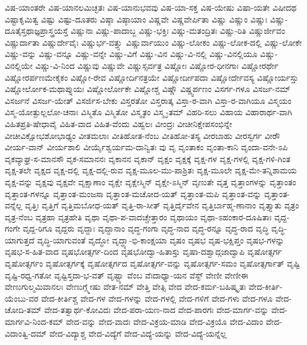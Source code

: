 {ವಿಷ-ಯಾಂತರೇ
ವಿಷ-ಯಾನಲಮಿಚ್ಛತಃ
ವಿಷ-ಯಾನುಭವವು
ವಿಷ-ಯಾ-ಸಕ್ತ
ವಿಷ-ಯೇಷು
ವಿಷಾ-ಯತೇ
ವಿಷೀದಥ
ವಿಷ್ಟಾಕೃಮಿತ್ವ
ವಿಷ್ಟು
ವಿಷ್ಟು-ದೂತರು
ವಿಷ್ಠಾ
ವಿಷ್ಠಾಯಾಂ
ವಿಷ್ಣವೇ
ವಿಷ್ಣವೇರ್ಪಿತಾ
ವಿಷ್ಣು
ವಿಷ್ಣುಂ
ವಿಷ್ಣುಃ
ವಿಷ್ಣು-ದೂತೈಸ್ತಥಾಜ್ಞಪ್ರಾಸ್ತ್ರಯಸ್ತೆ
ವಿಷ್ಣುನಾ
ವಿಷ್ಣು-ಪಾದಾಬ್ಜ
ವಿಷ್ಣು-ಭಕ್ತಿಃ
ವಿಷ್ಣು-ಮತಂದ್ರಿತಃ
ವಿಷ್ಣು-ರಿತಿ
ವಿಷ್ಣುರ್ಜೀವಂ
ವಿಷ್ಣುರ್ದಾತಾ
ವಿಷ್ಣುರ್ದೇವೈಃ
ವಿಷ್ಣುರ್ಭ-ವತ್ತ್ಸು
ವಿಷ್ಣುರ್ವಾಯುಂ
ವಿಷ್ಣು-ಲೋಕಂ
ವಿಷ್ಣು-ಲೋಕ-ದಲ್ಲಿ
ವಿಷ್ಣು-ಲೋಕೇ
ವಿಷ್ಣು-ವನ್ನು
ವಿಷ್ಣು-ವನ್ನೂ
ವಿಷ್ಣು-ವನ್ನೇ
ವಿಷ್ಣು-ವಿಗೆ
ವಿಷ್ಣು-ವಿನ
ವಿಷ್ಣು-ವಿ-ನಲ್ಲಿ
ವಿಷ್ಣು-ವಿನಲ್ಲಿಯೂ
ವಿಷ್ಣು-ವಿನಲ್ಲಿಯೇ
ವಿಷ್ಣು-ವಿ-ನಿಂದ
ವಿಷ್ಣುವು
ವಿಷ್ಣುವೇ
ವಿಷ್ಣುಸ್ಸರ್ವತ್ರ
ವಿಷ್ಣೋಃ
ವಿಷ್ಣೋರ-ಧೀನಗಾಃ
ವಿಷ್ಣೋರರ್ಥೇ
ವಿಷ್ಣೋರರ್ಪಣಮೇಕೈಕಂ
ವಿಷ್ಣೋ-ರೇವ
ವಿಷ್ಣೋರ್ದಿನತ್ರಯೇ
ವಿಷ್ಣೋರ್ದೀಪದಾ
ವಿಷ್ಣೋರ್ದೇವಸ್ಯ
ವಿಷ್ಣೋರ್ಯಸ್ತು
ವಿಷ್ಣೋರ್ಲೋಕ-ಮಥಾಪ್ನುಯಃ
ವಿಷ್ಣೋರ್ಲೋಕೇ
ವಿಷ್ಣೋಶ್ಚ
ವಿಷ್ಣೌ
ವಿಷ್ಣ್ವರ್ಪಣಂ
ವಿಸರ್ಗ-ಗಳೂ
ವಿಸರ್ಜ-ನಮ್
ವಿಸರ್ಜನೆ
ವಿಸರ್ಜ-ಯೇತ್
ವಿಸರ್ಜಿಸ-ಬೇಕು
ವಿಸ್ತರತೋ
ವಿಸ್ತರಾತ್ಕ
ವಿಸ್ತಾ-ರ-ವಾಗಿ
ವಿಸ್ತಾ-ರ-ವಾಗಿಯೂ
ವಿಸ್ಮಯಂ
ವಿಸ್ಮ-ಯೋತ್ಫುಲ್ಲಲೋ-ಚನಾಃ
ವಿಸ್ಮಿತೊ
ವಿಸ್ಮಿತೋ
ವಿಸ್ಮೃತಂ
ವಿಸ್ಮೃ-ತಮ್
ವಿಹರಿ-ಸಲು
ವಿಹಾಯ
ವಿಹಾರಾರ್ಥ-ವಾಗಿ
ವಿಹಿತಪ್ರತಿ-ಷೇಧಾವೈ
ವಿಹಿತ-ವಾದ
ವಿಹಿತ-ವೆಂದು
ವಿಹ್ವಲಃ
ವೀಂದ್ರಃ
ವೀಚೀನಿಕ್ಷೇಪಸಂಭಿನ್ನೇ
ವೀಚೀವಿಕ್ಷೋಭಶೋಭಾಢ್ಯಂ
ವೀತಮಲಾಃ
ವೀತಿಹೋತ-ನೆಂಬ
ವೀತಿಹೋ-ತಸ್ಯ
ವೀರಬಾಹು
ವೀರಸ್ವರ್ಗ
ವೀರೌ
ವೀರ್ಯ-ವಾನ್
ವೀರ್ಯಶಾಲಿ
ವೀರ್ಯೈಶ್ವರ್ಯಮ-ದಾನ್ವಿತಃ
ವು
ವೃ
ವೃಂತಾಕಂ
ವೃಂತಾ-ಕಾನಿ
ವೃಂದಾ-ವನೇ-ಽಪಿ
ವೃಕವ್ಯಾಘ್ರ-ಸ-ಮಾನಸೌ
ವೃಕ-ಸಮಾನನಃ
ವೃಕಾನನ
ವೃಕಾನ್
ವೃಕ್ಷಂ
ವೃಕ್ಷಕ್ಕೆ
ವೃಕ್ಷ-ಗಳ
ವೃಕ್ಷ-ಗಳಲ್ಲಿ
ವೃಕ್ಷ-ಗಳಿ-ಗಿಂತ
ವೃಕ್ಷ-ತಲೇ
ವೃಕ್ಷದ
ವೃಕ್ಷ-ದಲ್ಲಿ
ವೃಕ್ಷ-ದಲ್ಲಿ-ರುವ
ವೃಕ್ಷ-ಮೂಲ-ಮು-ಪಾಶ್ರಿತಃ
ವೃಕ್ಷ-ಮೂಲೇ
ವೃಕ್ಷ-ಮೇ-ತನ್ನಿಶಾಮಯ
ವೃಕ್ಷ-ವನ್ನು
ವೃಕ್ಷವು
ವೃಕ್ಷವೇ
ವೃಕ್ಷಾಣಾಂ
ವೃಕ್ಷೇ
ವೃಕ್ಷೇಸ್ಮಿನ್
ವೃಕ್ಷೇ-ಽಸ್ಮಿನ್
ವೃಣುತೇ
ವೃತ್ತ
ವೃತ್ತಾಂಗಳನ್ನು
ವೃತ್ತಾಂತಂ
ವೃತ್ತಾಂತ-ಗಳನ್ನೂ
ವೃತ್ತಾಂತ-ಮಂಜಸಾ
ವೃತ್ತಾಂತ-ಮಚೋದ-ಯತ್
ವೃತ್ತಾಂತ-ಮಪಿ
ವೃತ್ತಾಂತ-ವನ್ನು
ವೃತ್ತಾಂತ-ವನ್ನೆಲ್ಲ
ವೃತ್ತಿಃ
ವೃತ್ತಿಗೆ
ವೃತ್ತಿಮಬೋಧ-ಯತ್
ವೃತ್ತಿ-ರಾ-ಸೀತ್
ವೃತ್ತಿರ್ದೈವೇನ
ವೃತ್ತಿರ್ಬಾಹ್ಮ-ಣಾನಾಂ
ವೃತ್ತ್ಯಾತು
ವೃತ್ರಂ
ವೃತ್ರ-ನೆಂಬ
ವೃತ್ರಹಾ
ವೃತ್ರಹೇತಿ
ವೃಥಾ
ವೃಥಾ-ಪ-ವಾದಚ್ಚೇತ್ತಾರಂ
ವೃಥಾಯಂ
ವೃಥಾ-ಽಹಂಕಾರ-ದೂಷಿತಾಃ
ವೃದ್ದ-ಗಂಗೇ
ವೃದ್ದ-ರಿಗೂ
ವೃದ್ದರು
ವೃದ್ದಾಃ
ವೃದ್ದಾನಾಂ
ವೃದ್ಧ-ಗಂಗಾ
ವೃದ್ಧ-ನಾದ
ವೃದ್ಧ-ರನ್ನೂ
ವೃದ್ಧ-ರಾದ
ವೃದ್ಧಿ
ವೃದ್ಧಿ-ಯಾಗುತ್ತದೆ
ವೃದ್ಧಿ-ಯಾಗುವಂತೆ
ವೃದ್ಧೋ
ವೃದ್ಧ್ಯಾ-ಭಿ-ಕಾಂಕ್ಷಯಾ
ವೃಷಂ
ವೃಷಭ
ವೃಷ-ಭಕ್ಷಿಪ್ತಂ
ವೃಷಭ-ಗಳನ್ನು
ವೃಷಭ-ಸ-ಹಿತ-ವಾದ
ವೃಷಭೋತ್ಸರ್ಗ-ದಿಂದ
ವೃಷಭೋದ್ವಾ-ಹಿತಾಸ್ತು
ವೃಷಾ-ದಶ್ವಾದ್ಗಜಾದ್ವಾಪಿ
ವೃಷೋತ್ಸರ್ಗ
ವೃಷೋತ್ಸರ್ಗಂ
ವೃಷೋತ್ಸರ್ಗಕ್ಕೆ
ವೃಷೋತ್ಸರ್ಗದ
ವೃಷೋತ್ಸರ್ಗ-ವನ್ನು
ವೃಷೋತ್ಸರ್ಗ-ಸಮಂ
ವೃಷೋತ್ಸರ್ಗಾತ್
ವೃಷ್ಟಿ
ವೃಷ್ಟಿ-ರಧ್ವ-ಗತೋ
ವೃಷ್ಟಿಸ್ತದಾ-ಭ-ವತ್
ವೃಷ್ಟ್ಯಾ
ವೆಂಬ
ವೆಃದಾಧ್ಯಾ-ಯನ
ವೆಸ್ಟ್
ವೇಣೀ
ವೇಣೀಈ
ವೇಣುಗುಲ್ಮಮಿವಾನಲಃ
ವೇಣುಗ್ಲ್ಮೇಷು
ವೇತ-ನಮ್
ವೇತ್ತಿ
ವೇತ್ಸಿ
ವೇದ
ವೇದ-ಕರ್ಮ-ಬಹಿಷ್ಕೃತಃ
ವೇದ-ಕೀರ್ತಿ-ಯೆಂಬು-ವರ
ವೇದ-ಕೀರ್ತಿಶ್ಚ
ವೇದ-ಗಳ
ವೇದ-ಗಳನ್ನು
ವೇದ-ಗಳಲ್ಲಿ
ವೇದ-ಗಳಿಗೆ
ವೇದ-ಗಳು
ವೇದ-ಗಳೂ
ವೇದ-ಚೋದಿ-ತಮ್
ವೇದ-ತತ್ವಾರ್ಥ-ಕೋವಿದಃ
ವೇದ-ಪರಾ-ಯಣ-ನಾದ
ವೇದ-ಪಾರಗಃ
ವೇದ-ಮಾರ್ಗ-ವನ್ನು
ವೇದ-ಮಾರ್ಗವಿ-ನಿಂದ-ಕಮ್
ವೇದ-ವನ್ನು
ವೇದ-ವಾದಃ
ವೇದ-ವಿಕ್ರಯ-ಮಾಡಿ
ವೇದ-ವಿಕ್ರಯೊ
ವೇದ-ವಿದಾಂ
ವೇದ-ವಿದಾಂತ್ವಿ-ದಮ್
ವೇದ-ವಿದ್ಯಾಶ್ಚ
ವೇದ-ವಿದ್ಯೆಗೆ
ವೇದ-ವಿದ್ಯೆ-ಯನ್ನು
ವೇದ-ವಿದ್ಯೆ-ಯನ್ನೆಲ್ಲ
}
